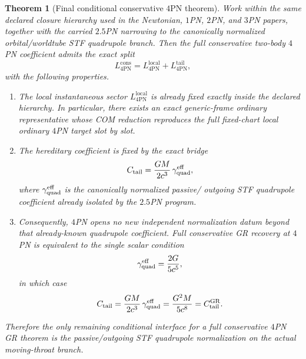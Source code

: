 \documentclass[11pt]{article}
\newtheorem{theorem}{Theorem}
\begin{document}
\begin{theorem}[Final conditional conservative \texorpdfstring{$4$}{4}PN theorem]
\label{thm:final-conditional-4pn}
Work within the same declared closure hierarchy used in the Newtonian, $1$PN,
$2$PN, and $3$PN papers, together with the carried $2.5$PN narrowing to the
canonically normalized orbital/worldtube STF quadrupole branch.  Then the full
conservative two-body $4$PN coefficient admits the exact split
\begin{equation}
L_{4\mathrm{PN}}^{\mathrm{cons}}
=
L_{4\mathrm{PN}}^{\mathrm{local}}
+
L_{4\mathrm{PN}}^{\mathrm{tail}},
\label{eq:final-4pn-split}
\end{equation}
with the following properties.
\begin{enumerate}[label=(\roman*)]
  \item The local instantaneous sector \(L_{4\mathrm{PN}}^{\mathrm{local}}\)
  is already fixed exactly inside the declared hierarchy.  In particular, there
  exists an exact generic-frame ordinary representative whose COM reduction
  reproduces the full fixed-chart local ordinary $4$PN target slot by slot.

  \item The hereditary coefficient is fixed by the exact bridge
  \begin{equation}
  C_{\rm tail}=
  \frac{GM}{2c^3}\,\gamma_{\rm quad}^{\rm eff},
  \label{eq:final-4pn-tail-bridge}
  \end{equation}
  where \(\gamma_{\rm quad}^{\rm eff}\) is the canonically normalized passive/
  outgoing STF quadrupole coefficient already isolated by the $2.5$PN program.

  \item Consequently, $4$PN opens no new independent normalization datum beyond
  that already-known quadrupole coefficient.  Full conservative GR recovery at
  $4$PN is equivalent to the single scalar condition
  \begin{equation}
  \gamma_{\rm quad}^{\rm eff}=\frac{2G}{5c^5},
  \label{eq:final-4pn-gr-recovery-condition}
  \end{equation}
  in which case
  \begin{equation}
  C_{\rm tail}
  =
  \frac{GM}{2c^3}\,\gamma_{\rm quad}^{\rm eff}
  =
  \frac{G^2M}{5c^8}
  =
  C_{\rm tail}^{\rm GR}.
  \label{eq:final-4pn-gr-tail-recovery}
  \end{equation}
\end{enumerate}
Therefore the only remaining conditional interface for a full conservative $4$PN
GR theorem is the passive/outgoing STF quadrupole normalization on the actual
moving-throat branch.
\end{theorem}
\end{document}
